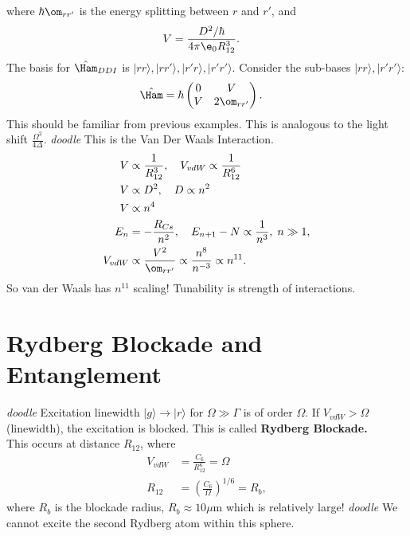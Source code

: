\documentclass[a4paper, 11pt, normalem]{report}
\begin{document}
where $\hbar\om_{rr'}$ is the energy splitting between $r$ and $r'$, and
\begin{align}
    V &= \frac{D^2/\hbar}{4\pi\e_0 R_{12}^3}.
\end{align}
The basis for $\hat{\Ham}_{DDI}$ is $|rr\rangle,|rr'\rangle,|r'r\rangle,|r'r'\rangle$.
Consider the sub-bases $|rr\rangle,|r'r'\rangle$:
\begin{align}
    \hat{\Ham} &= \hbar\begin{pmatrix} 0 & V \\ V & 2\om_{rr'}\end{pmatrix}.
\end{align}
This should be familiar from previous examples.
This is analogous to the light shift $\frac{\Omega^2}{4\Delta}$.
\textit{doodle}
This is the Van Der Waals Interaction.
\begin{align}
    V &\propto \frac{1}{R_{12}^3},\quad V_{vdW} \propto \frac{1}{R_{12}^6} \\
    V &\propto D^2,\quad D\propto n^2 \\
    V &\propto n^4 \\
    E_n &= -\frac{R_{Cs}}{n^2},\quad E_{n+1} -N \propto \frac{1}{n^3},\; n\gg 1, \\
    V_{vdW} &\propto \frac{V^2}{\om_{rr'}} \propto \frac{n^8}{n^{-3}} \propto n^{11}.
\end{align}
So van der Waals has $n^{11}$ scaling!
Tunability is strength of interactions.

\chapter{Rydberg Blockade and Entanglement}
\textit{doodle}
Excitation linewidth $|g\rangle\to|r\rangle$ for $\Omega\gg\Gamma$ is of order $\Omega$.
If $V_{vdW}>\Omega$ (linewidth), the excitation is blocked.
This is called \textbf{Rydberg Blockade.}\\
This occurs at distance $R_{12}$, where
\begin{align}
    V_{vdW} &= \frac{C_6}{R_{12}^6} = \Omega \\
    R_{12} &= \left(\frac{C_6}{\Omega}\right)^{1/6} = R_b,
\end{align}
where $R_b$ is the blockade radius, $R_b\approx10\mu$m which is relatively large!
\emph{doodle}
We cannot excite the second Rydberg atom within this sphere.
\end{document}
